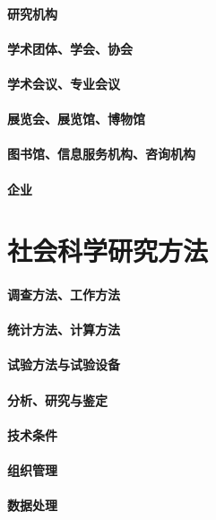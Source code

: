 \documentclass[UTF8]{../RepresentationUniverse}
\begin{document}
\subsubsection{研究机构}
\subsubsection{学术团体、学会、协会}
\subsubsection{学术会议、专业会议}
\subsubsection{展览会、展览馆、博物馆}
\subsubsection{图书馆、信息服务机构、咨询机构}
\subsubsection{企业}


\chapter{社会科学研究方法}
\subsubsection{调查方法、工作方法}
\subsubsection{统计方法、计算方法}
\subsubsection{试验方法与试验设备}
\subsubsection{分析、研究与鉴定}
\subsubsection{技术条件}
\subsubsection{组织管理}
\subsubsection{数据处理}
\end{document}
